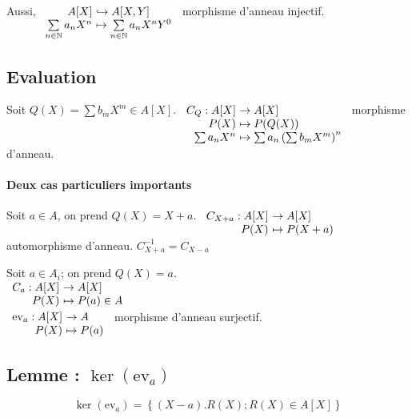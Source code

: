 \documentclass[reqno,a4paper,10pt]{report}
\makeatletter
\newcommand{\set}[1]{\left\lbrace #1 \right\rbrace} %
\newcommand{\IN}{\ensuremath{\mathbb{N}}\xspace} %
\newcommand{\inj}{\hookrightarrow}
\newcommand{\ev}[1]{\mathrm{ev}_{ #1 }}
\let\oldenumerate=\enumerate%
\renewenvironment{enumerate}{%
    \oldenumerate%
  }{%
    \@noparlisttrue%
    \endlist%
  }%
\makeatother
\begin{document}
Aussi, $
\begin{array}[t]{r@{\ }l}
  A[X] &\inj A[X,Y]\\
  \sum\limits_{n\in \IN} a_n X^n &\mapsto  \sum\limits_{n \in \IN} a_n
  X^n Y^0
\end{array}$ morphisme d'anneau injectif.

\subsection{Evaluation}
Soit $Q(X) = \sum b_m X^m \in A[X]$.
$\begin{array}[t]{r@{\ }l}
  C_Q : A[X] &\to A[X]\\
  P(X) &\mapsto P(Q(X))\\
  \sum a_n X^n &\mapsto \sum a_n \left( \sum b_m X^m \right)^n
\end{array}$ morphisme d'anneau.

\paragraph{Deux cas particuliers importants}
\begin{enumerate}
  \item Soit $a\in A$, on prend $Q(X) = X + a$.
    $\begin{array}[t]{r@{\ }l}
      C_{X+a} : A[X] &\to A[X]\\
      P(X) &\mapsto P(X+a)
    \end{array}$ automorphisme d'anneau. $C_{X+a}^{-1}=C_{X-a}$
  \item Soit $a\in A_i$; on prend $Q(X)=a$.\\
    $\begin{array}[t]{r@{\ }l}
      C_a: A[X] &\to A[X]\\
      P(X) &\mapsto P(a) \in A
    \end{array}$\\
    $\begin{array}[t]{r@{\ }l}
       \ev{a}: A[X] &\to A\\
      P(X) &\mapsto P(a)
    \end{array}$ morphisme d'anneau surjectif.
\end{enumerate} 
\subsection{Lemme : $\ker(\ev a)$}
\[\ker(\ev a) = \set{(X-a).R(X); R(X) \in A[X]}\]
\begin{comment}
preuve 07/10/09 p1
\end{comment}
\end{document}
